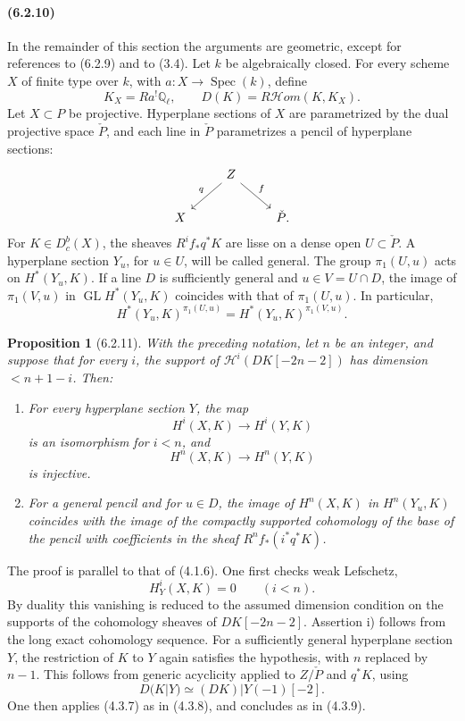 \documentclass[11pt]{article}
\newtheorem{proposition}{Proposition}
\theoremstyle{remark}
\newcommand{\Ql}{\mathbb{Q}_\ell}
\begin{document}
\paragraph{(6.2.10)}
In the remainder of this section the arguments are geometric, except for references to (6.2.9) and to (3.4).  Let \(k\) be algebraically closed.  For every scheme \(X\) of finite type over \(k\), with \(a:X\to\operatorname{Spec}(k)\), define
\[
K_X=Ra^!\Ql,
\qquad
D(K)=R\mathcal Hom(K,K_X).
\]
Let \(X\subset P\) be projective.  Hyperplane sections of \(X\) are parametrized by the dual projective space \(\check P\), and each line in \(\check P\) parametrizes a pencil of hyperplane sections:
\[
\begin{tikzcd}
& Z \arrow[dl,"q"'] \arrow[dr,"f"] & \\
X && \check P .
\end{tikzcd}
\]
For \(K\in D^b_c(X)\), the sheaves \(R^if_*q^*K\) are lisse on a dense open \(U\subset\check P\).  A hyperplane section \(Y_u\), for \(u\in U\), will be called general.  The group \(\pi_1(U,u)\) acts on \(H^*(Y_u,K)\).  If a line \(D\) is sufficiently general and \(u\in V=U\cap D\), the image of \(\pi_1(V,u)\) in \(\operatorname{GL}H^*(Y_u,K)\) coincides with that of \(\pi_1(U,u)\).  In particular,
\[
H^*(Y_u,K)^{\pi_1(U,u)}=H^*(Y_u,K)^{\pi_1(V,u)}. \tag{6.2.10.2}
\]

\begin{proposition}[6.2.11]
With the preceding notation, let \(n\) be an integer, and suppose that for every \(i\), the support of \(\mathcal H^i(DK[-2n-2])\) has dimension \(<n+1-i\).  Then:
\begin{enumerate}[label=\roman*)]
\item For every hyperplane section \(Y\), the map
\[
H^i(X,K)\longrightarrow H^i(Y,K)
\]
is an isomorphism for \(i<n\), and
\[
H^n(X,K)\longrightarrow H^n(Y,K)
\]
is injective.
\item For a general pencil and for \(u\in D\), the image of \(H^n(X,K)\) in \(H^n(Y_u,K)\) coincides with the image of the compactly supported cohomology of the base of the pencil with coefficients in the sheaf \(R^nf_*(i^*q^*K)\).
\end{enumerate}
\end{proposition}

The proof is parallel to that of (4.1.6).  One first checks weak Lefschetz,
\[
H^i_Y(X,K)=0 \qquad (i<n).
\]
By duality this vanishing is reduced to the assumed dimension condition on the supports of the cohomology sheaves of \(DK[-2n-2]\).  Assertion i) follows from the long exact cohomology sequence.  For a sufficiently general hyperplane section \(Y\), the restriction of \(K\) to \(Y\) again satisfies the hypothesis, with \(n\) replaced by \(n-1\).  This follows from generic acyclicity applied to \(Z/\check P\) and \(q^*K\), using
\[
D(K|Y)\simeq (DK)|Y(-1)[-2].
\]
One then applies (4.3.7) as in (4.3.8), and concludes as in (4.3.9).
\end{document}
